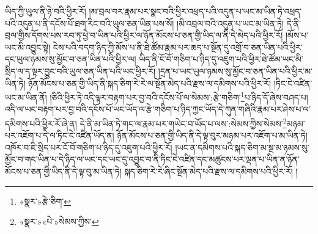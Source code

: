 ཡིད་ཀྱི་ཡུལ་ནི་ཉེ་བའི་ཕྱིར་རོ། །མ་བྲལ་བར་རྣམ་པར་སྣང་བའི་ཕྱིར་འཕྲད་པའི་འདུན་པ་ཡང་མ་ཡིན་ཏེ་འཕྲད་པའི་འདུན་པ་ནི་དངོས་པོ་ཐག་རིང་བའི་ཡུལ་ཅན་ཡིན་པས་སོ། །མི་འབྲལ་བའི་འདུན་པ་ཡང་མ་ཡིན་ཏེ། དེ་ནི་བྲལ་གྱིས་དོགས་པས་རབ་ཏུ་ཕྱེ་བ་ཡིན་པའི་ཕྱིར་ལ་ཉོན་མོངས་པ་ཅན་གྱི་ཡིད་ལ་ནི་དེ་མེད་པའི་ཕྱིར་རོ། །མོས་པ་ཡང་མི་འབྱུང་སྟེ། ངེས་པའི་བདག་ཉིད་ཀྱི་མོས་པ་ནི་ཐེ་ཚོམ་རྣམ་པར་ཆད་པ་སྔོན་དུ་འགྲོ་བ་ཅན་ཡིན་པའི་ཕྱིར་དང་ཡུལ་ཉམས་སུ་མྱོང་བ་ཅན་ཡིན་པའི་ཕྱིར་ལ། ཡིད་ནི་ངོ་བོ་གཅིག་པ་ཉིད་དུ་འཇུག་པའི་ཕྱིར་ཐེ་ཚོམ་ཡང་མི་སྲིད་ལ་ད་ལྟར་བྱུང་བའི་ཡུལ་ཅན་ཡིན་པའི་ཡང་ཕྱིར་རོ། །དྲན་པ་ཡང་ཡུལ་ཉམས་སུ་མྱོང་བ་ཅན་ཡིན་པའི་ཕྱིར་མ་ཡིན་ཏེ། ཉོན་མོངས་པ་ཅན་གྱི་ཡིད་ནི་སྐད་ཅིག་རེ་རེ་ལ་སྔོན་མེད་པའི་རྫས་ལ་དམིགས་པའི་ཕྱིར་རོ། །ཏིང་ངེ་འཛིན་ཡང་མ་ཡིན་ནོ། །ཅིའི་ཕྱིར་ཏེ་འདི་ལྟར་བརྟག་པར་བྱ་བའི་དངོས་པོ་ལ་སེམས་:རྩེ་གཅིག་\footnote{«སྣར་»རྩེ་ཅིག་}པ་ཉིད་དོ་ཞེས་བཤད་པ། འདི་ལ་ཡང་བརྟག་པར་བྱ་བའི་དངོས་པོ་ཡང་ཡོད་ལ་རྩེ་གཅིག་པ་ཉིད་ཀྱང་ཡོད་དེ་ཀུན་གཞིའི་རྣམ་པར་ཤེས་པ་ལ་དམིགས་པའི་ཕྱིར་རོ་ཞེ་ན། དེ་ནི་མ་ཡིན་ཏེ་གང་ལ་རྣམ་པར་གཡེང་བ་ཡོད་པ་ལས་:སེམས་ཀྱིས་སེམས་\footnote{«སྣར་»«པེ་»སེམས་ཀྱིས་}མཉམ་པར་འཇོག་པ་དེ་ལ་ཏིང་ངེ་འཛིན་ཡོད་ན། ཉོན་མོངས་པ་ཅན་གྱི་ཡིད་ནི་དེ་ལྟ་བུར་མཉམ་པར་འཇོག་པ་མ་ཡིན་ཏེ། འཁོར་བ་ཇི་སྲིད་པར་ངོ་བོ་གཅིག་པ་ཉིད་དུ་འཇུག་པའི་ཕྱིར་རོ། །ཡང་ན་དམིགས་པའི་སྐད་ཅིག་མ་སྔ་མ་ཉམས་སུ་མྱོང་བ་གང་ཡིན་པ་དེ་ཉིད་ལ་ཡང་དང་ཡང་དུ་འབྱུང་བ་ནི་ཏིང་ངེ་འཛིན་དང་མཚུངས་པར་ལྡན་པ་ཡིན་ན་ཉོན་མོངས་པ་ཅན་གྱི་ཡིད་ནི་དེ་ལྟ་བུ་མ་ཡིན་ཏེ། སྐད་ཅིག་རེ་རེ་ཞིང་སྔོན་མེད་པའི་རྫས་ལ་དམིགས་པའི་ཕྱིར་རོ། །
